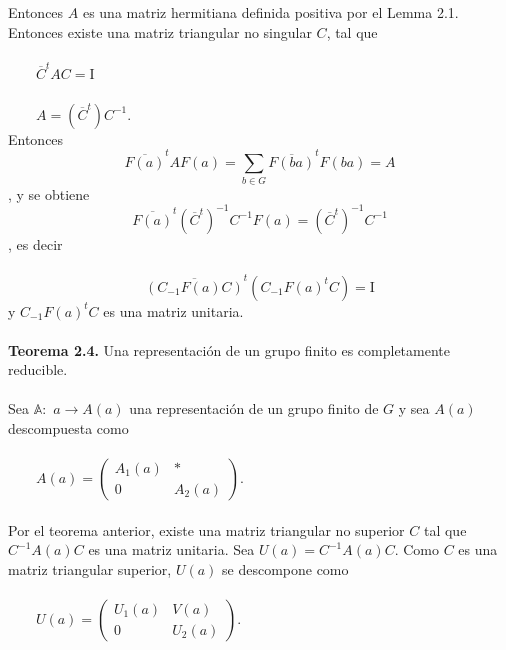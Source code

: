 \documentclass[12pt]{book}
\theoremstyle{definition}
\newcounter{in}
\newcounter{ini}
\begin{document}
\\~\\
Entonces $A$ es una matriz hermitiana definida positiva por el Lemma 2.1. Entonces existe una matriz triangular no singular $C$, tal que\\~\\
$\qquad \overline{C}^{t}AC= \mathrm{I}$\\~\\
$\qquad A=\left(\overline{C}^{t}\right)C^{-1}$.\\
Entonces
\begin{equation*}
\overline{F\left(a\right)}^{t}AF\left(a\right)=\sum_{b \in G} \overline{F\left(ba\right)}^{t}F\left(ba\right)=A
\end{equation*},
y se obtiene
\begin{equation*}
\overline{F\left(a\right)}^{t}(\overline{C}^{t})^{-1}C^{-1}F\left(a\right)=(\overline{C}^{t})^{-1}C^{-1}
\end{equation*},
es decir\\~\\
\begin{equation*}
\overline{(C_{-1}F(a)C)}^{t}(C_{-1}F(a)^{t}C)=\mathrm{I}
\end{equation*}
y $C_{-1}F(a)^{t}C$ es una matriz unitaria.\\~\\
\textbf{Teorema 2.4.} Una representación de un grupo finito es completamente reducible.\\~\\
Sea $\mathbb{A}:$ $a\rightarrow A\left(a\right)$ una representación de un grupo finito de $G$ y sea $A(a)$ descompuesta como\\~\\
$\qquad
A(a)=
\begin{pmatrix}
A_{1}(a) & * \\ 
0 & A_{2}(a)
\end{pmatrix}$.\\~\\
Por el teorema anterior, existe una matriz triangular no superior $C$ tal que $C^{-1}A(a)C$ es una matriz unitaria. Sea $U(a)=C^{-1}A(a)C$. Como $C$ es una matriz triangular superior, $U(a)$ se descompone como\\~\\
$\qquad
U(a)=
\begin{pmatrix}
U_{1}(a) & V(a) \\ 
0 & U_{2}(a)
\end{pmatrix}$.\\~\\
\end{document}
